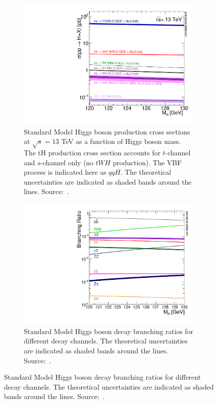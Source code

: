 \begin{figure}[htbp]
  \centering
  \begin{subfigure}[htbp]{0.48\textwidth}
    \centering
    \includegraphics[width=\textwidth]{figures_and_tables/theory/higgs_prod_modes.pdf}
    \caption{ Standard Model Higgs boson production cross sections at $\sqrt{s}=13$ TeV as a function of Higgs boson mass. The tH production cross section accounts for $t$-channel and $s$-channel only (no $tWH$ production). The VBF process is indicated here as $qqH$. The theoretical
    uncertainties are indicated as shaded bands around the lines. Source:~\cite{deFlorian:2016spz}.}
    \label{higgs_prod_modes}
  \end{subfigure}
  \hfill
  \begin{subfigure}[htbp]{0.48\textwidth}
    \centering
    \includegraphics[width=\textwidth]{figures_and_tables/theory/higgs_decays.pdf}
    \caption{Standard Model Higgs boson decay branching ratios for different decay channels. The theoretical uncertainties are indicated as shaded bands around the lines. Source:~\cite{deFlorian:2016spz}.}
    \label{higgs_decays}
  \end{subfigure}
\end{figure}

